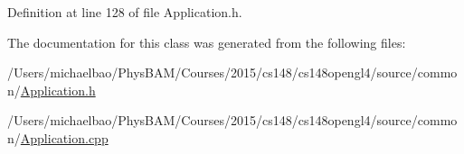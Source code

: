 Definition at line 128 of file Application.\+h.



The documentation for this class was generated from the following files\+:\begin{DoxyCompactItemize}
\item 
/\+Users/michaelbao/\+Phys\+B\+A\+M/\+Courses/2015/cs148/cs148opengl4/source/common/\hyperlink{_application_8h}{Application.\+h}\item 
/\+Users/michaelbao/\+Phys\+B\+A\+M/\+Courses/2015/cs148/cs148opengl4/source/common/\hyperlink{_application_8cpp}{Application.\+cpp}\end{DoxyCompactItemize}
